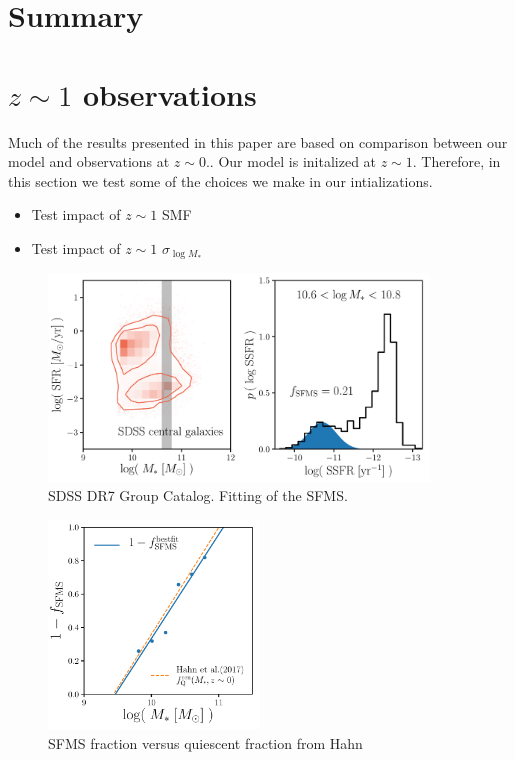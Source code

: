 \documentclass[12pt, letterpaper, preprint]{aastex}
\newcommand{\bitem}{\begin{itemize}}
\newcommand{\eitem}{\end{itemize}}
\begin{document}
\section{Summary} \label{sec:summary}


\appendix
\section{$z \sim 1$ observations} \label{app:z1}
Much of the results presented in this paper are based on comparison 
between our model and observations at $z \sim 0.$. Our model is initalized 
at $z \sim 1$. Therefore, in this section we test some of the choices 
we make in our intializations. 

\bitem
\item Test impact of $z \sim 1$ SMF
\item Test impact of $z \sim 1$ $\sigma_{\log M_*}$ 
\eitem

\begin{figure}
\begin{center}
\includegraphics[width=0.9\textwidth]{figs/groupcat.pdf}
\caption{SDSS DR7 Group Catalog. Fitting of the SFMS.}
\label{fig:groupcat}
\end{center}
\end{figure}

\begin{figure}
\begin{center}
\includegraphics[width=0.5\textwidth]{figs/fq_fsfms.pdf}
\caption{SFMS fraction versus quiescent fraction from Hahn}
\label{fig:fq_fsfms}
\end{center}
\end{figure}
\end{document}
